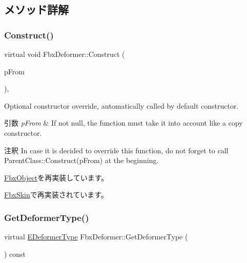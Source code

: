 \subsection{メソッド詳解}
\mbox{\label{class_fbx_deformer_ac50e8e0e8cfd2934f8f8cca2d69a6f58}} 
\subsubsection{\texorpdfstring{Construct()}{Construct()}}
{\footnotesize\ttfamily virtual void Fbx\+Deformer\+::\+Construct (\begin{DoxyParamCaption}\item[{const \hyperlink{class_fbx_object}{Fbx\+Object} $\ast$}]{p\+From }\end{DoxyParamCaption})\hspace{0.3cm}{\ttfamily [protected]}, {\ttfamily [virtual]}}

Optional constructor override, automatically called by default constructor. 
\begin{DoxyParams}{引数}
{\em p\+From} & If not null, the function must take it into account like a copy constructor. \\
\hline
\end{DoxyParams}
\begin{DoxyRemark}{注釈}
In case it is decided to override this function, do not forget to call Parent\+Class\+::\+Construct(p\+From) at the beginning. 
\end{DoxyRemark}


\hyperlink{class_fbx_object_a313503bc645af3fdceb4a99ef5cea7eb}{Fbx\+Object}を再実装しています。



\hyperlink{class_fbx_skin_aeebbc037507285cdb2e066f420970208}{Fbx\+Skin}で再実装されています。

\mbox{\label{class_fbx_deformer_adbc586e383f788f24d7fce9ed859d481}} 
\subsubsection{\texorpdfstring{Get\+Deformer\+Type()}{GetDeformerType()}}
{\footnotesize\ttfamily virtual \hyperlink{class_fbx_deformer_a07e2cfb767191ba5c8799fdfbfe3eaf6}{E\+Deformer\+Type} Fbx\+Deformer\+::\+Get\+Deformer\+Type (\begin{DoxyParamCaption}{ }\end{DoxyParamCaption}) const\hspace{0.3cm}{\ttfamily [virtual]}}

